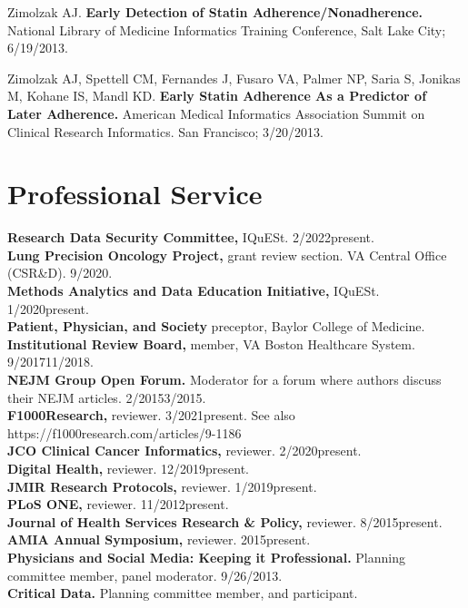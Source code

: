 \documentclass[10pt]{article}
\begin{document}
Zimolzak AJ. \textbf{Early Detection of Statin
  Adherence/Nonadherence.} National Library of Medicine Informatics
Training Conference, Salt Lake City; 6/19/2013.

Zimolzak AJ, Spettell CM, Fernandes J, Fusaro VA, Palmer NP, Saria S,
Jonikas M, Kohane IS, Mandl KD. \textbf{Early Statin Adherence As a
  Predictor of Later Adherence.} American Medical Informatics
Association Summit on Clinical Research Informatics. San Francisco;
3/20/2013.




\section*{Professional Service}

\textbf{Research Data Security Committee,} IQuESt.
2/2022\ndash{}present.\\
\textbf{Lung Precision Oncology Project,} grant review section. VA
Central Office  (CSR\&D). 9/2020.\\
\textbf{Methods Analytics and Data Education Initiative,} IQuESt.
1/2020\ndash{}present.\\
\textbf{Patient, Physician, and Society} preceptor, Baylor College of
Medicine.\\
\textbf{Institutional Review Board,} member, VA Boston Healthcare System.
9/2017\ndash{}11/2018.\\
\textbf{NEJM Group Open Forum.} Moderator for a forum where
authors discuss their NEJM articles. 2/2015\ndash{}3/2015.\\
\textbf{F1000Research,} reviewer. 3/2021\ndash{}present. See also
https://f1000research.com/articles/9-1186\\
\textbf{JCO Clinical Cancer Informatics,} reviewer. 2/2020\ndash{}present.\\
\textbf{Digital Health,} reviewer. 12/2019\ndash{}present.\\
\textbf{JMIR Research Protocols,} reviewer. 1/2019\ndash{}present.\\
\textbf{PLoS ONE,} reviewer. 11/2012\ndash{}present.\\
\textbf{Journal of Health Services Research \& Policy,} reviewer.
8/2015\ndash{}present.\\
\textbf{AMIA Annual Symposium,} reviewer. 2015\ndash{}present.\\
\textbf{Physicians and Social Media: Keeping it Professional.}
Planning committee member, panel moderator. 9/26/2013.\\
\textbf{Critical Data.} Planning committee member, and participant.
\end{document}
